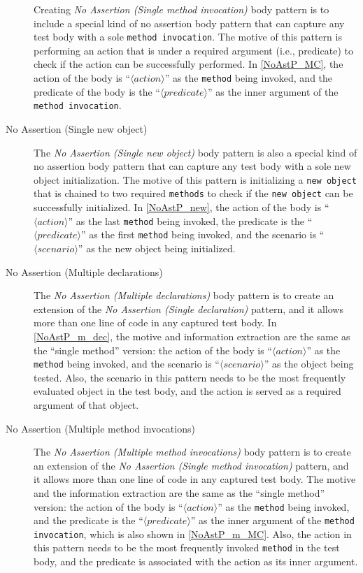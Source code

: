 \documentclass[proposal.tex]{subfiles}
\begin{document}
\begin{description}
Creating \textit{No Assertion (Single method invocation)} body pattern is to include a special kind of no assertion body pattern that can capture any test body with a sole \texttt{method invocation}.
%
The motive of this pattern is performing an action that is under a required argument (i.e., predicate) to check if the action can be successfully performed.
%
In \cref{NoAstP_MC}, the action of the body is \enquote{$\langle action \rangle$} as the \texttt{method} being invoked, and the predicate of the body is the \enquote{$\langle predicate \rangle$} as the inner argument of the \texttt{method invocation}.


\item[No Assertion (Single new object)]

The \textit{No Assertion (Single new object)} body pattern is also a special kind of no assertion body pattern that can capture any test body with a sole new object initialization.
%
The motive of this pattern is initializing a \texttt{new object} that is chained to two required \texttt{methods} to check if the \texttt{new object} can be successfully initialized.
%
In \cref{NoAstP_new}, the action of the body is \enquote{$\langle action \rangle$} as the last \texttt{method} being invoked, the predicate is the \enquote{$\langle predicate \rangle$} as the first \texttt{method} being invoked, and the scenario is \enquote{$\langle scenario \rangle$} as the new object being initialized.

\item[No Assertion (Multiple declarations)]

The \textit{No Assertion (Multiple declarations)} body pattern is to create an extension of the \textit{No Assertion (Single declaration)} pattern, and it allows more than one line of code in any captured test body.
%
In \cref{NoAstP_m_dec}, the motive and information extraction are the same as the \enquote{single method} version: the action of the body is \enquote{$\langle action \rangle$} as the \texttt{method} being invoked, and the scenario is \enquote{$\langle scenario \rangle$} as the object being tested.
%
Also, the scenario in this pattern needs to be the most frequently evaluated object in the test body, and the action is served as a required argument of that object.


\item[No Assertion (Multiple method invocations)]


The \textit{No Assertion (Multiple method invocations)} body pattern is to create an extension of the \textit{No Assertion (Single method invocation)} pattern, and it allows more than one line of code in any captured test body.
%
The motive and the information extraction are the same as the \enquote{single method} version: the action of the body is \enquote{$\langle action \rangle$} as the \texttt{method} being invoked, and the predicate is the \enquote{$\langle predicate \rangle$} as the inner argument of the \texttt{method invocation}, which is also shown in \cref{NoAstP_m_MC}.
%
Also, the action in this pattern needs to be the most frequently invoked \texttt{method} in the test body, and the predicate is associated with the action as its inner argument.


\end{description}
\end{document}
